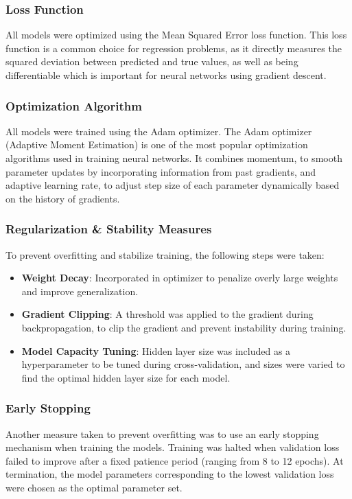 \documentclass[conference]{IEEEtran}
\begin{document}
\subsubsection{\textbf{Loss Function}}
All models were optimized using the Mean Squared Error loss function. This loss function is a common choice for regression problems, as it directly measures the squared deviation between predicted and true values, as well as being differentiable which is important for neural networks using gradient descent.

\subsubsection{\textbf{Optimization Algorithm}}
All models were trained using the Adam optimizer. The Adam optimizer (Adaptive Moment Estimation) is one of the most popular optimization algorithms used in training neural networks. It combines momentum, to smooth parameter updates by incorporating information from past gradients, and adaptive learning rate, to adjust step size of each parameter dynamically based on the history of gradients.

\subsubsection{\textbf{Regularization \& Stability Measures}}
To prevent overfitting and stabilize training, the following steps were taken:
\begin{itemize}
    \item \textbf{Weight Decay}: Incorporated in optimizer to penalize overly large weights and improve generalization.
    \item \textbf{Gradient Clipping}: A threshold was applied to the gradient during backpropagation, to clip the gradient and prevent instability during training.
    \item \textbf{Model Capacity Tuning}: Hidden layer size was included as a hyperparameter to be tuned during cross-validation, and sizes were varied to find the optimal hidden layer size for each model.
\end{itemize}

\subsubsection{\textbf{Early Stopping}}
Another measure taken to prevent overfitting was to use an early stopping mechanism when training the models. Training was halted when validation loss failed to improve after a fixed patience period (ranging from 8 to 12 epochs). At termination, the model parameters corresponding to the lowest validation loss were chosen as the optimal parameter set.
\end{document}
